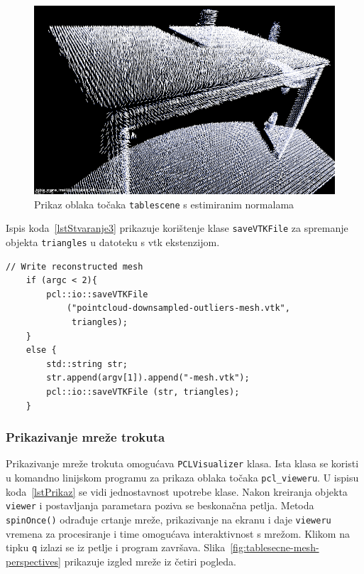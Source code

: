 
\begin{figure}[h]
\centering
\includegraphics[scale=0.5]{figures/tablescene-normals.png}
\caption{Prikaz oblaka točaka \texttt{tablescene} s estimiranim
normalama }
\label{fig:tablescene-normals}
\end{figure}

Ispis koda~\ref{lstStvaranje3} prikazuje korištenje klase
\texttt{saveVTKFile} za spremanje objekta \texttt{triangles} u datoteku
s vtk ekstenzijom.

\begin{lstlisting}[label=lstStvaranje3,caption={Dio izvornog koda o
    zapisivanju mreže iz funkcije \texttt{reconstruct\_mesh()} }]
    // Write reconstructed mesh
    if (argc < 2){
        pcl::io::saveVTKFile
            ("pointcloud-downsampled-outliers-mesh.vtk",
             triangles);
    }
    else {
        std::string str;
        str.append(argv[1]).append("-mesh.vtk");
        pcl::io::saveVTKFile (str, triangles);
    }
\end{lstlisting}


\newpage
\subsubsection{Prikazivanje mreže trokuta} %
\label{ssub:Prikazivanje mreže trokuta}
Prikazivanje mreže trokuta omogućava \texttt{PCLVisualizer} klasa. Ista
klasa se koristi u komandno linijskom programu za prikaza oblaka točaka
\texttt{pcl\_vieweru}. U ispisu koda~\ref{lstPrikaz} se vidi
jednostavnost upotrebe klase. Nakon kreiranja objekta \texttt{viewer} i
postavljanja parametara poziva se beskonačna petlja. Metoda
\texttt{spinOnce()} odrađuje crtanje mreže, prikazivanje na ekranu i
daje \texttt{vieweru} vremena za procesiranje i time omogućava
interaktivnost s mrežom. Klikom na tipku \texttt{q} izlazi se iz petlje
i program završava.  Slika~\ref{fig:tablesecne-mesh-perspectives}
prikazuje izgled mreže iz četiri pogleda.

